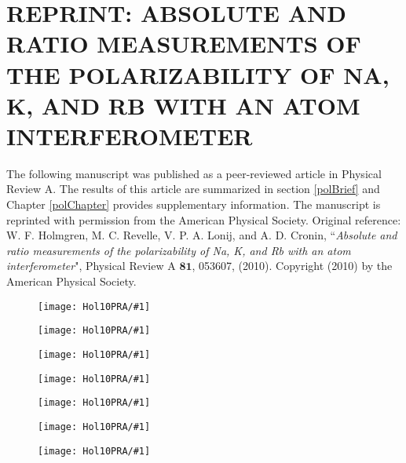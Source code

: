 \chapter{REPRINT: ABSOLUTE AND RATIO MEASUREMENTS OF THE POLARIZABILITY OF NA, K, AND RB WITH AN ATOM INTERFEROMETER}
\label{polPRAappendix}
The following manuscript was published as a peer-reviewed article in Physical Review A. The results of this article are summarized in section \ref{polBrief} and Chapter \ref{polChapter} provides supplementary information. The manuscript is reprinted with permission from the American Physical Society. Original reference: W. F. Holmgren, M. C. Revelle, V. P. A. Lonij, and A. D. Cronin, ``\emph{Absolute and ratio measurements of the polarizability of Na, K, and Rb with an atom interferometer}", Physical Review A $\mathbf{81}$, 053607, (2010). Copyright (2010) by the American Physical Society.

\newcommand{\figPRA}[1]{
\begin{figure}
\texttt{[image: Hol10PRA/\#1]}
\end{figure}
} 


\figPRA{pg1}
\figPRA{pg2}
\figPRA{pg3}
\figPRA{pg4}
\figPRA{pg5}
\figPRA{pg6}
\figPRA{pg7}